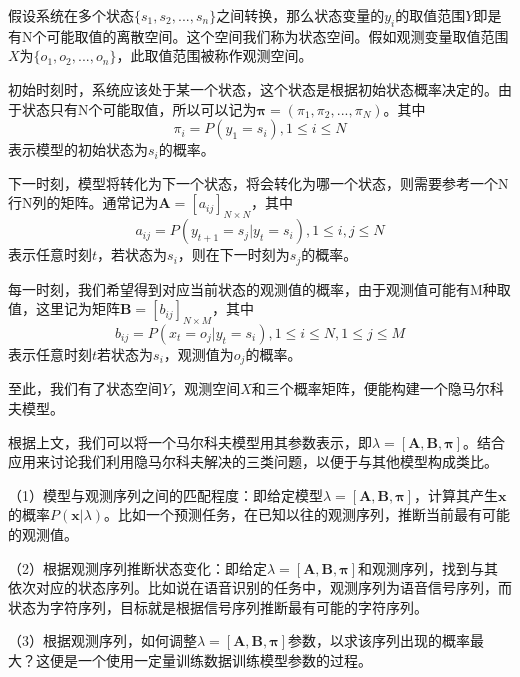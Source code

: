 假设系统在多个状态\(\{s_1,s_2,...,s_n\}\)之间转换，那么状态变量的\(y_i\)的取值范围\(Y\)即是有N个可能取值的离散空间。这个空间我们称为状态空间。假如观测变量取值范围\(X\)为\(\{o_1,o_2,...,o_n\}\)，此取值范围被称作观测空间。

初始时刻时，系统应该处于某一个状态，这个状态是根据初始状态概率决定的。由于状态只有N个可能取值，所以可以记为\(\boldsymbol{\pi} = (\pi_1,\pi_2,...,\pi_N)\)。其中\begin{equation}\pi_i = P(y_1 = s_i), 1 \le i \le N \end{equation}表示模型的初始状态为\(s_i\)的概率。

下一时刻，模型将转化为下一个状态，将会转化为哪一个状态，则需要参考一个N行N列的矩阵。通常记为\(\boldsymbol{A} = [a_{ij}]_{N \times N}\)，其中\begin{equation}a_{ij} = P(y_{t+1} = s_j | y_t = s_i), 1 \le i, j \le N\end{equation}表示任意时刻\(t\)，若状态为\(s_i\)，则在下一时刻为\(s_j\)的概率。

每一时刻，我们希望得到对应当前状态的观测值的概率，由于观测值可能有M种取值，这里记为矩阵\(\boldsymbol{B} = [b_{ij}]_{N \times M}\)，其中\begin{equation}b_{ij} = P(x_t = o_j | y_t = s_i), 1 \le i \le N, 1\le j \le M\end{equation}表示任意时刻\(t\)若状态为\(s_i\)，观测值为\(o_j\)的概率。

至此，我们有了状态空间\(Y\)，观测空间\(X\)和三个概率矩阵，便能构建一个隐马尔科夫模型。

根据上文，我们可以将一个马尔科夫模型用其参数表示，即\(\lambda = [\boldsymbol{A},\boldsymbol{B},\boldsymbol{\pi}]\)。结合应用来讨论我们利用隐马尔科夫解决的三类问题，以便于与其他模型构成类比。

（1）模型与观测序列之间的匹配程度：即给定模型\(\lambda = [\boldsymbol{A},\boldsymbol{B},\boldsymbol{\pi}]\)，计算其产生\(\boldsymbol{x}\)的概率\(P(\boldsymbol{x} | \lambda)\)。比如一个预测任务，在已知以往的观测序列，推断当前最有可能的观测值。

（2）根据观测序列推断状态变化：即给定\(\lambda = [\boldsymbol{A},\boldsymbol{B},\boldsymbol{\pi}]\)和观测序列，找到与其依次对应的状态序列。比如说在语音识别的任务中，观测序列为语音信号序列，而状态为字符序列，目标就是根据信号序列推断最有可能的字符序列。

（3）根据观测序列，如何调整\(\lambda = [\boldsymbol{A},\boldsymbol{B},\boldsymbol{\pi}]\)参数，以求该序列出现的概率最大？这便是一个使用一定量训练数据训练模型参数的过程。

